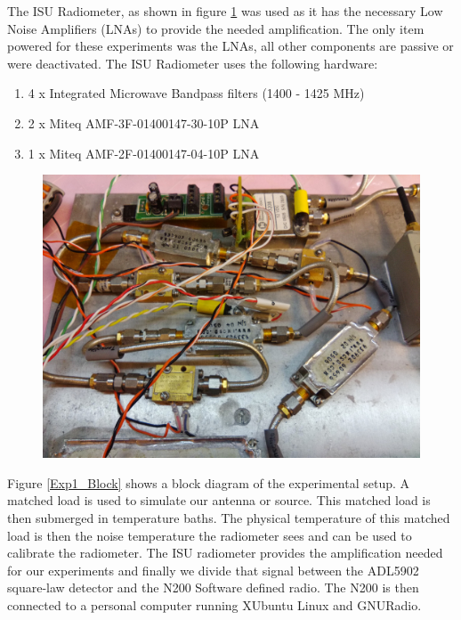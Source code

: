 The ISU Radiometer, as shown in figure \ref{ISURF} was used as it has the necessary Low Noise Amplifiers (LNAs) to provide the needed amplification.  The only item powered for these experiments was the LNAs, all other components are passive or were deactivated.  The ISU Radiometer uses the following hardware:

\begin{enumerate}
\item 4 x Integrated Microwave Bandpass filters (1400 - 1425 MHz)
\item 2 x Miteq AMF-3F-01400147-30-10P LNA
\item 1 x Miteq AMF-2F-01400147-04-10P LNA
\end{enumerate}

{\begin{figure}[h!tb] \centering
\includegraphics[width=\textwidth]{Images/ISU_RF.jpg}
\label{ISURF}
\end{figure}
}

Figure \ref{Exp1_Block} shows a block diagram of the experimental setup.  A matched load is used to simulate our antenna or source.  This matched load is then submerged in temperature baths.  The physical temperature of this matched load is then the noise temperature the radiometer sees and can be used to calibrate the radiometer.  The ISU radiometer provides the amplification needed for our experiments and finally we divide that signal between the ADL5902 square-law detector and the N200 Software defined radio.  The N200 is then connected to a personal computer running XUbuntu Linux and GNURadio.

